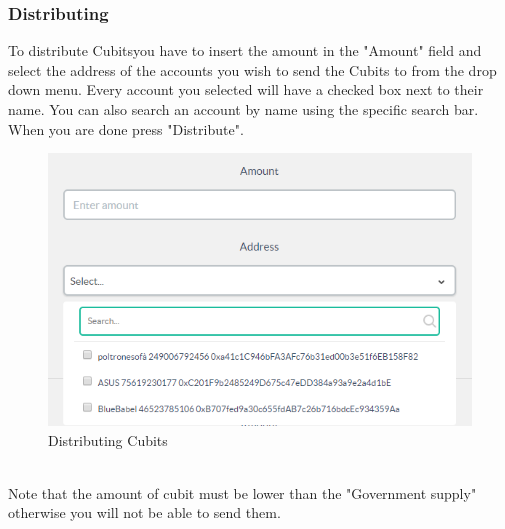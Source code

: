		\subsubsection{Distributing}
		To distribute Cubits\glosp you have to insert the amount in the "Amount" 
		field and select the address of the accounts you wish to send the Cubits to 
		from the drop down menu. Every account you selected will have a checked 
		box next to their name. You can also search an account by name using the 
		specific search bar. When you are done press "Distribute".\\
		\begin{figure}[H]
			\includegraphics[width=15cm]{res/images/distributing.png}
			\centering
			\caption{Distributing Cubits}
		\end{figure} \mbox{}\\
		\noindent Note that the amount of cubit must be lower than the "Government  
		supply" otherwise you will not be able to send them.
